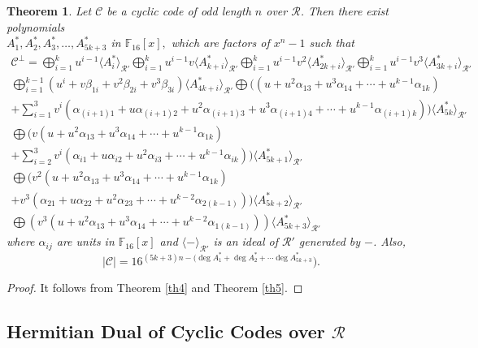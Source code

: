 \documentclass{amsart}
\newtheorem{theorem}{Theorem}[section]
\theoremstyle{definition}
\theoremstyle{remark}
\numberwithin{equation}{section}
\begin{document}
\begin{theorem}\label{th6}
		Let $\mathcal{C}$ be a cyclic code of odd length $n$ over $\mathcal{R}$. Then there exist polynomials \\
		$A_1^*, A_2^*, A_3^*, \dots , A_{5k+3}^*$ in $\mathbb F_{16}[x],$ which are factors of $x^n-1$ such that
 \begin{gather*}
		\mathcal{C}^\perp = \bigoplus_{i=1}^{k} u^{i-1}\langle A_{i}^*\rangle_{\mathcal{R}'}
  \bigoplus_{i=1}^{k} u^{i-1}v\langle A_{k+i}^*\rangle_{\mathcal{R}'} \bigoplus_{i=1}^{k} u^{i-1}v^2\langle A_{2k+i}^*\rangle_{\mathcal{R}'}  \bigoplus_{i=1}^{k} u^{i-1}v^3\langle A_{3k+i}^*\rangle_{\mathcal{R}'} \\
        \bigoplus_{i=1}^{k-1} (u^i+ v\beta_{1i} + v^2\beta_{2i} + v^3\beta_{3i}) \langle A_{4k+i}^*\rangle_{\mathcal{R}'}   \bigoplus ((u + u^2\alpha_{13} + u^3\alpha_{14} + \cdots + u^{k-1}\alpha_{1k})
     \\ + \sum_{i=1}^{3} v^i( \alpha_{(i+1)1} + u\alpha_{(i+1)2} + u^2\alpha_{(i+1)3} + u^3\alpha_{(i+1)4} + \cdots + u^{k-1}\alpha_{(i+1)k} ))\langle A_{5k}^*\rangle_{\mathcal{R}'}
     \\  \bigoplus   (v(u + u^2\alpha_{13} + u^3\alpha_{14} + \cdots + u^{k-1}\alpha_{1k})
       \\+ \sum_{i=2}^{3} v^i( \alpha_{i1} + u\alpha_{i2} + u^2\alpha_{i3} + \cdots + u^{k-1}\alpha_{ik} ))\langle A_{5k+1}^*\rangle_{\mathcal{R}'}
     \\  \bigoplus  (v^2(u + u^2\alpha_{13} + u^3\alpha_{14} + \cdots + u^{k-1}\alpha_{1k})
      \\ + v^3( \alpha_{21} + u\alpha_{22} + u^2\alpha_{23}  + \cdots + u^{k-2}\alpha_{2(k-1)}))\langle A_{5k+2}^*\rangle_{\mathcal{R}'}
     \\  \bigoplus  (v^3(u + u^2\alpha_{13} + u^3\alpha_{14} + \cdots + u^{k-2}\alpha_{1(k-1)}))\langle A_{5k+3}^*\rangle_{\mathcal{R}'}
		\end{gather*}		
where $\alpha_{ij} $ are units in $\mathbb F_{16}[x]$ and $\langle - \rangle_{\mathcal{R}'} $ is an ideal of $\mathcal{R}'$ generated by $-$. Also,
		$$|\mathcal{C}|=16^{(5k+3)n-(\deg A_1^*+\deg A_2^*+ \cdots \deg A_{5k+3}^* }).$$

	\end{theorem}
 \begin{proof}
     It follows from Theorem \ref{th4} and Theorem  \ref{th5}.
 \end{proof}

\subsection{Hermitian Dual of Cyclic Codes over $\mathcal{R}$ }
\end{document}
